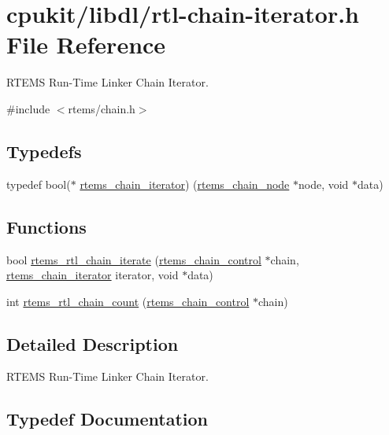 \hypertarget{rtl-chain-iterator_8h}{}\section{cpukit/libdl/rtl-\/chain-\/iterator.h File Reference}
\label{rtl-chain-iterator_8h}


R\+T\+E\+MS Run-\/\+Time Linker Chain Iterator.  


{\ttfamily \#include $<$rtems/chain.\+h$>$}\newline
\subsection*{Typedefs}
\begin{DoxyCompactItemize}
\item 
typedef bool($\ast$ \mbox{\hyperlink{rtl-chain-iterator_8h_a4a6076e3f99c2cd93d4cec1b50199f45}{rtems\+\_\+chain\+\_\+iterator}}) (\mbox{\hyperlink{structChain__Node__struct}{rtems\+\_\+chain\+\_\+node}} $\ast$node, void $\ast$data)
\end{DoxyCompactItemize}
\subsection*{Functions}
\begin{DoxyCompactItemize}
\item 
bool \mbox{\hyperlink{rtl-chain-iterator_8h_aa16454dff4035ca37c6a6f68c4b4ce6b}{rtems\+\_\+rtl\+\_\+chain\+\_\+iterate}} (\mbox{\hyperlink{unionChain__Control}{rtems\+\_\+chain\+\_\+control}} $\ast$chain, \mbox{\hyperlink{rtl-chain-iterator_8h_a4a6076e3f99c2cd93d4cec1b50199f45}{rtems\+\_\+chain\+\_\+iterator}} iterator, void $\ast$data)
\item 
int \mbox{\hyperlink{rtl-chain-iterator_8h_abba44d4b003ea714cc986e27e454f76e}{rtems\+\_\+rtl\+\_\+chain\+\_\+count}} (\mbox{\hyperlink{unionChain__Control}{rtems\+\_\+chain\+\_\+control}} $\ast$chain)
\end{DoxyCompactItemize}


\subsection{Detailed Description}
R\+T\+E\+MS Run-\/\+Time Linker Chain Iterator. 



\subsection{Typedef Documentation}
\mbox{\label{rtl-chain-iterator_8h_a4a6076e3f99c2cd93d4cec1b50199f45}} 
